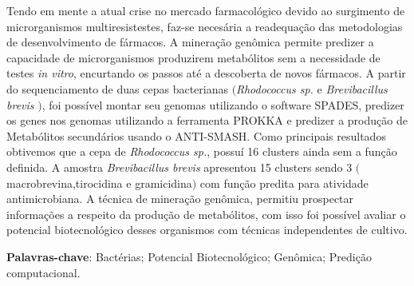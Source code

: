 \setlength{\absparsep}{18pt} %
\begin{resumo}

Tendo em mente a atual crise no mercado farmacológico devido ao surgimento de microrganismos
multiresistestes, faz-se necesária a readequação das metodologias de desenvolvimento de fármacos.
A mineração genômica permite predizer a capacidade de microrganismos produzirem
metabólitos sem a necessidade de testes \textit{in vitro}, encurtando os passos
até a descoberta de novos fármacos. A partir do sequenciamento de duas cepas
bacterianas $($\textit{Rhodococcus sp.} e \textit{Brevibacillus brevis} $)$, foi 
possível montar seu genomas utilizando o software SPADES, predizer os genes nos
genomas utilizando a ferramenta PROKKA e predizer a produção de Metabólitos 
secundários usando o ANTI-SMASH.  Como principais resultados obtivemos que a cepa
de \textit{Rhodococcus sp.}, possuí 16 clusters ainda sem a função definida.
A amostra \textit{Brevibacillus brevis} apresentou 15 clusters sendo 3 $($macrobrevina,tirocidina e gramicidina$)$ com função predita
para atividade antimicrobiana. A técnica de mineração genômica, permitiu prospectar informações
a respeito da produção de metabólitos, com isso foi possível avaliar o potencial biotecnológico
desses organismos com técnicas independentes de cultivo.

\vspace{\onelineskip}
\noindent 
\textbf{Palavras-chave}: Bactérias; Potencial Biotecnológico; Genômica; Predição computacional.

\end{resumo}


